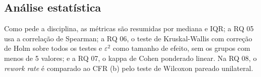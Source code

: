 \subsection{Análise estatística}

Como pede a disciplina, as métricas são resumidas por mediana e IQR; a RQ 05 usa a correlação de Spearman; a RQ 06, o teste de Kruskal-Wallis com correção de Holm sobre todos os testes e $\varepsilon^2$ como tamanho de efeito, sem os grupos com menos de 5 valores; e a RQ 07, o kappa de Cohen ponderado linear. Na RQ 08, o \textit{rework rate} é comparado ao CFR (b) pelo teste de Wilcoxon pareado unilateral.
